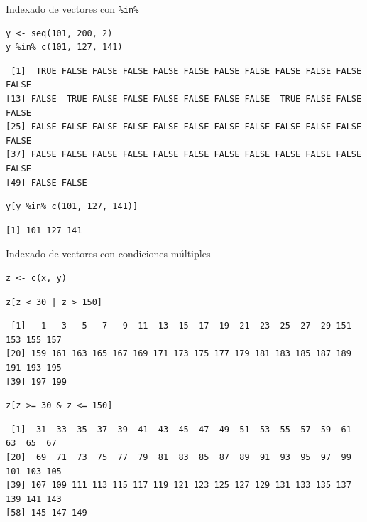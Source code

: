 \documentclass[xcolor={usenames,svgnames,dvipsnames}]{beamer}
\begin{document}
\begin{frame}[fragile,label=sec-2-1-9]{Indexado de vectores con \texttt{\%in\%}}
 \lstset{language=R,label= ,caption= ,numbers=none}
\begin{lstlisting}
y <- seq(101, 200, 2)
y %in% c(101, 127, 141)
\end{lstlisting}

\begin{verbatim}
 [1]  TRUE FALSE FALSE FALSE FALSE FALSE FALSE FALSE FALSE FALSE FALSE FALSE
[13] FALSE  TRUE FALSE FALSE FALSE FALSE FALSE FALSE  TRUE FALSE FALSE FALSE
[25] FALSE FALSE FALSE FALSE FALSE FALSE FALSE FALSE FALSE FALSE FALSE FALSE
[37] FALSE FALSE FALSE FALSE FALSE FALSE FALSE FALSE FALSE FALSE FALSE FALSE
[49] FALSE FALSE
\end{verbatim}

\lstset{language=R,label= ,caption= ,numbers=none}
\begin{lstlisting}
y[y %in% c(101, 127, 141)]
\end{lstlisting}

\begin{verbatim}
[1] 101 127 141
\end{verbatim}
\end{frame}

\begin{frame}[fragile,label=sec-2-1-10]{Indexado de vectores con condiciones múltiples}
 \lstset{language=R,label= ,caption= ,numbers=none}
\begin{lstlisting}
z <- c(x, y)
\end{lstlisting}

\lstset{language=R,label= ,caption= ,numbers=none}
\begin{lstlisting}
z[z < 30 | z > 150]
\end{lstlisting}

\begin{verbatim}
 [1]   1   3   5   7   9  11  13  15  17  19  21  23  25  27  29 151 153 155 157
[20] 159 161 163 165 167 169 171 173 175 177 179 181 183 185 187 189 191 193 195
[39] 197 199
\end{verbatim}

\lstset{language=R,label= ,caption= ,numbers=none}
\begin{lstlisting}
z[z >= 30 & z <= 150]
\end{lstlisting}

\begin{verbatim}
 [1]  31  33  35  37  39  41  43  45  47  49  51  53  55  57  59  61  63  65  67
[20]  69  71  73  75  77  79  81  83  85  87  89  91  93  95  97  99 101 103 105
[39] 107 109 111 113 115 117 119 121 123 125 127 129 131 133 135 137 139 141 143
[58] 145 147 149
\end{verbatim}
\end{frame}
\end{document}
